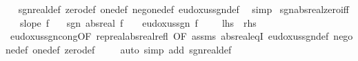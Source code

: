 \begin{isabellebody}
\isadelimproof
\ %
\endisadelimproof
%
\isatagproof
{}\isamarkupfalse%
\ sgn{\isacharunderscore}{\kern0pt}real{\isacharunderscore}{\kern0pt}def\ zero{\isacharunderscore}{\kern0pt}def\ one{\isacharunderscore}{\kern0pt}def\ neg{\isacharunderscore}{\kern0pt}one{\isacharunderscore}{\kern0pt}def\ eudoxus{\isacharunderscore}{\kern0pt}sgn{\isacharunderscore}{\kern0pt}def\ \isamarkupfalse%
\ simp%
\endisatagproof
{\isafoldproof}%
%
\isadelimproof
%
\endisadelimproof
\isanewline
\isanewline
{}\isamarkupfalse%
\ sgn{\isacharunderscore}{\kern0pt}abs{\isacharunderscore}{\kern0pt}real{\isacharunderscore}{\kern0pt}zero{\isacharunderscore}{\kern0pt}iff{\isacharcolon}{\kern0pt}\isanewline
\ \ \ {\isachardoublequoteopen}slope\ f{\isachardoublequoteclose}\isanewline
\ \ \ {\isachardoublequoteopen}sgn\ {\isacharparenleft}{\kern0pt}abs{\isacharunderscore}{\kern0pt}real\ f{\isacharparenright}{\kern0pt}\ {\isacharequal}{\kern0pt}\ {}\ {\isasymlongleftrightarrow}\ {\isacharparenleft}{\kern0pt}eudoxus{\isacharunderscore}{\kern0pt}sgn\ f\ {\isacharequal}{\kern0pt}\ {\isacharparenleft}{\kern0pt}{\isasymlambda}{\isacharunderscore}{\kern0pt}{\isachardot}{\kern0pt}\ {}{\isacharparenright}{\kern0pt}{\isacharparenright}{\kern0pt}{\isachardoublequoteclose}\ {\isacharparenleft}{\kern0pt}\ {\isachardoublequoteopen}{\isacharquery}{\kern0pt}lhs\ {\isasymlongleftrightarrow}\ {\isacharquery}{\kern0pt}rhs{\isachardoublequoteclose}{\isacharparenright}{\kern0pt}\isanewline
%
\isadelimproof
\ \ %
\endisadelimproof
%
\isatagproof
{}\isamarkupfalse%
\ eudoxus{\isacharunderscore}{\kern0pt}sgn{\isacharunderscore}{\kern0pt}cong{\isacharbrackleft}{\kern0pt}OF\ rep{\isacharunderscore}{\kern0pt}real{\isacharunderscore}{\kern0pt}abs{\isacharunderscore}{\kern0pt}real{\isacharunderscore}{\kern0pt}refl{\isacharcomma}{\kern0pt}\ OF\ assms{\isacharbrackright}{\kern0pt}\ abs{\isacharunderscore}{\kern0pt}real{\isacharunderscore}{\kern0pt}eqI\ eudoxus{\isacharunderscore}{\kern0pt}sgn{\isacharunderscore}{\kern0pt}def\ neg{\isacharunderscore}{\kern0pt}one{\isacharunderscore}{\kern0pt}def\ one{\isacharunderscore}{\kern0pt}def\ zero{\isacharunderscore}{\kern0pt}def\ \isanewline
\ \ \isamarkupfalse%
\ {\isacharparenleft}{\kern0pt}auto\ simp\ add{\isacharcolon}{\kern0pt}\ sgn{\isacharunderscore}{\kern0pt}real{\isacharunderscore}{\kern0pt}def{\isacharparenright}{\kern0pt}%
\endisatagproof
{\isafoldproof}%
%
\isadelimproof
\isanewline
%
\endisadelimproof
\isanewline

\end{isabellebody}
